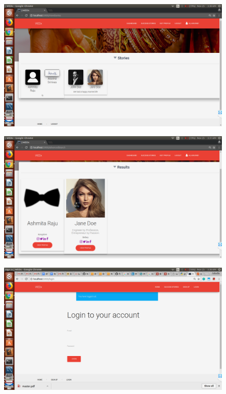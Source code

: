 \documentclass[12pt]{report}
\begin{document}
\begin{figure}[!htb]
    \centering
    \includegraphics[width=1\textwidth]{sc-23.png}
\end{figure}

\begin{figure}[!htb]
    \centering
    \includegraphics[width=1\textwidth]{sc-24.png}
\end{figure}

\begin{figure}[!htb]
    \centering
    \includegraphics[width=1\textwidth]{sc-25.png}
\end{figure}
\end{document}
